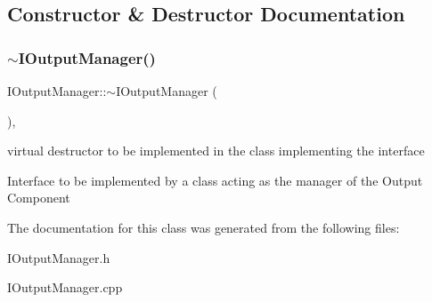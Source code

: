 \subsection{Constructor \& Destructor Documentation}
\mbox{\label{class_i_output_manager_a7442c5161bf453dc13605f7aaeeea2b5}} 
\subsubsection{\texorpdfstring{$\sim$\+I\+Output\+Manager()}{~IOutputManager()}}
{\footnotesize\ttfamily I\+Output\+Manager\+::$\sim$\+I\+Output\+Manager (\begin{DoxyParamCaption}{ }\end{DoxyParamCaption})\hspace{0.3cm}{\ttfamily [pure virtual]}, {\ttfamily [default]}}



virtual destructor to be implemented in the class implementing the interface 

Interface to be implemented by a class acting as the manager of the Output Component 

The documentation for this class was generated from the following files\+:\begin{DoxyCompactItemize}
\item 
I\+Output\+Manager.\+h\item 
I\+Output\+Manager.\+cpp\end{DoxyCompactItemize}
